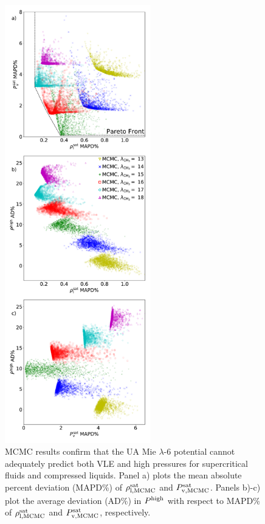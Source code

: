 \documentclass[preprint,letterpaper,floatfix,citeautoscript,aip,jcp]{revtex4-1}
\begin{document}
\begin{figure}[p!]
	\centering
	\includegraphics[width=2.5in]{MCMC_Mie_13_14_15_16_17_18_ethane_Pareto}
	\caption{MCMC results confirm that the UA Mie $\lambda$-6 potential cannot adequately predict both VLE and high pressures for supercritical fluids and compressed liquids. Panel a) plots the mean absolute percent deviation (MAPD\%) of $\rho_{\rm l, MCMC}^{\rm sat}$ and $P_{\rm v, MCMC}^{\rm sat}$. Panels b)-c) plot the average deviation (AD\%) in $P^{\rm high}$ with respect to MAPD\% of $\rho_{\rm l, MCMC}^{\rm sat}$ and $P_{\rm v, MCMC}^{\rm sat}$, respectively.}
	\label{fig:MCMC_Mie_13_14_15_16_17_18_ethane_Pareto}
\end{figure} 
\end{document}
